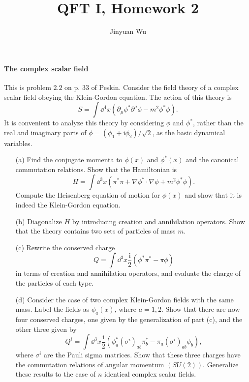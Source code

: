 \documentclass[hyperref, a4paper]{article}
\title{QFT I, Homework 2}
\author{Jinyuan Wu}
\newcommand*{\ii}{\mathrm{i}}
\begin{document}
\maketitle

\paragraph{The complex scalar field} This is problem $2.2$ on p. 33 of Peskin.
Consider the field theory of a complex scalar field obeying the Klein-Gordon equation. The action of this theory is
\begin{equation}
  S=\int \dd^{4} x\left(\partial_{\mu} \phi^{*} \partial^{\mu} \phi-m^{2} \phi^{*} \phi\right).
  \label{eq:prob-1-1}
\end{equation}
It is convenient to analyze this theory by considering $\phi$ and $\phi^{*}$, rather than the real and imaginary parts of $\phi=\left(\phi_{1}+ \ii \phi_{2}\right) / \sqrt{2}$, as the basic dynamical variables.
\begin{itemize}
  \item[(a)] Find the conjugate momenta to $\phi(x)$ and $\phi^{*}(x)$ and the canonical commutation relations. Show that the Hamiltonian is
  \begin{equation}
    H=\int \dd^{3} x\left(\pi^{*} \pi+\nabla \phi^{*} \cdot \nabla \phi+m^{2} \phi^{*} \phi\right).
    \label{eq:prob-1-2}
  \end{equation}
  Compute the Heisenberg equation of motion for $\phi(x)$ and show that it is indeed the Klein-Gordon equation.
  \item[(b)] Diagonalize $H$ by introducing creation and annihilation operators. Show that the theory contains two sets of particles of mass $m$.
  \item[(c)] Rewrite the conserved charge
  \begin{equation}
    Q=\int \dd^{3} x \frac{\ii}{2}\left(\phi^{*} \pi^{*}-\pi \phi\right)
    \label{eq:prob-1-3}
  \end{equation}
  in terms of creation and annihilation operators, and evaluate the charge of the particles of each type.
  \item[(d)] Consider the case of two complex Klein-Gordon fields with the same mass. Label the fields as $\phi_{a}(x)$, where $a=1,2$. Show that there are now four conserved charges, one given by the generalization of part (c), and the other three given by
  \begin{equation}
    Q^{i}=\int \dd^{3} x \frac{\ii}{2}\left(\phi_{a}^{*}\left(\sigma^{i}\right)_{a b} \pi_{b}^{*}-\pi_{a}\left(\sigma^{i}\right)_{a b} \phi_{b}\right),
    \label{eq:prob-1-4}
  \end{equation}
  where $\sigma^{i}$ are the Pauli sigma matrices. Show that these three charges have the commutation relations of angular momentum $(S U(2))$. Generalize these results to the case of $n$ identical complex scalar fields.
\end{itemize}
\end{document}
